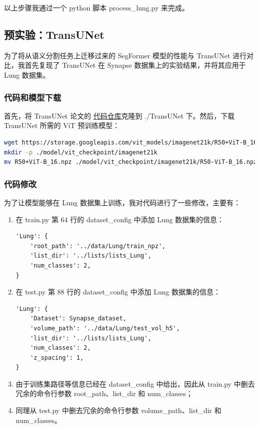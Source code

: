 \documentclass[hyperref,a4paper,UTF8]{ctexart}
\begin{document}
以上步骤我通过一个 python 脚本 process\_lung.py 来完成。

\subsection{预实验：TransUNet}

为了将从语义分割任务上迁移过来的 SegFormer 模型的性能与 TransUNet 进行对比，我首先复现了 TransUNet 在 Synapse 数据集上的实验结果，并将其应用于 Lung 数据集。

\subsubsection{代码和模型下载}

首先，将 TransUNet 论文的 \href{https://github.com/Beckschen/TransUNet}{代码仓库}克隆到 ./TransUNet 下。然后，下载 TransUNet 所需的 ViT 预训练模型：

\begin{lstlisting}[language=bash]
wget https://storage.googleapis.com/vit_models/imagenet21k/R50+ViT-B_16.npz
mkdir -p ./model/vit_checkpoint/imagenet21k
mv R50+ViT-B_16.npz ./model/vit_checkpoint/imagenet21k/R50-ViT-B_16.npz
\end{lstlisting}

\subsubsection{代码修改}

为了让模型能够在 Lung 数据集上训练，我对代码进行了一些修改，主要有：

\begin{enumerate}[itemsep=2pt,topsep=0pt,parsep=0pt]
    \item 在 train.py 第 64 行的 dataset\_config 中添加 Lung 数据集的信息：
\begin{lstlisting}
'Lung': {
    'root_path': '../data/Lung/train_npz',
    'list_dir': '../lists/lists_Lung',
    'num_classes': 2,
}
\end{lstlisting}
    \item 在 test.py 第 88 行的 dataset\_config 中添加 Lung 数据集的信息：
\begin{lstlisting}
'Lung': {
    'Dataset': Synapse_dataset,
    'volume_path': '../data/Lung/test_vol_h5',
    'list_dir': '../lists/lists_Lung',
    'num_classes': 2,
    'z_spacing': 1,
}
\end{lstlisting}
    \item 由于训练集路径等信息已经在 dataset\_config 中给出，因此从 train.py 中删去冗余的命令行参数 root\_path、list\_dir 和 num\_classes；
    \item 同理从 test.py 中删去冗余的命令行参数 volume\_path、list\_dir 和 num\_classes。
\end{enumerate}
\end{document}
